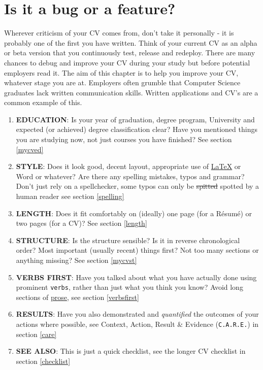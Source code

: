 \documentclass[
]{book}
\providecommand{\tightlist}{%
  \setlength{\itemsep}{0pt}\setlength{\parskip}{0pt}}
\begin{document}
\hypertarget{mycv}{%
\section{Is it a bug or a feature?}\label{mycv}}

Wherever criticism of your CV comes from, don't take it personally - it is probably one of the first you have written. Think of your current CV as an alpha or beta version that you continuously test, release and redeploy. There are many chances to debug and improve your CV during your study but before potential employers read it. The aim of this chapter is to help you improve your CV, whatever stage you are at. Employers often grumble that Computer Science graduates lack written communication skills. Written applications and CV's are a common example of this.

\begin{enumerate}
\def\labelenumi{\arabic{enumi}.}
\tightlist
\item
  \textbf{EDUCATION}: Is your year of graduation, degree program, University and expected (or achieved) degree classification clear? Have you mentioned things you are studying now, not just courses you have finished? See section \ref{mycved}
\item
  \textbf{STYLE}: Does it look good, decent layout, appropriate use of \href{https://latex4year1.netlify.app/}{LaTeX} or Word or whatever? Are there any spelling mistakes, typos and grammar? Don't just rely on a spellchecker, some typos can only be \sout{spitted} spotted by a human reader see section \ref{spelling}
\item
  \textbf{LENGTH}: Does it fit comfortably on (ideally) one page (for a Résumé) or two pages (for a CV)? See section \ref{length}
\item
  \textbf{STRUCTURE}: Is the structure sensible? Is it in reverse chronological order? Most important (usually recent) things first? Not too many sections or anything missing? See section \ref{mycvst}
\item
  \textbf{VERBS FIRST}: Have you talked about what you have actually done using prominent \texttt{verbs}, rather than just what you think you know? Avoid long sections of \href{https://en.wikipedia.org/wiki/Prose}{prose}, see section \ref{verbsfirst}
\item
  \textbf{RESULTS}: Have you also demonstrated and \emph{quantified} the outcomes of your actions where possible, see Context, Action, Result \& Evidence (\texttt{C.A.R.E.}) in section \ref{care}
\item
  \textbf{SEE ALSO}: This is just a quick checklist, see the longer CV checklist in section \ref{checklist}
\end{enumerate}
\end{document}
